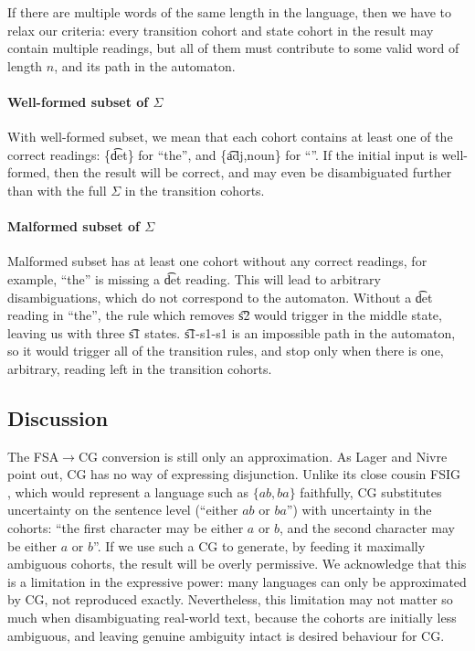 If there are multiple words of the same length in the language, then
we have to relax our criteria: every transition cohort and state
cohort in the result may contain multiple readings, but all of them
must contribute to some valid word of length $n$, and its path in the
automaton. 

\paragraph{Well-formed subset of $\Sigma$}
With well-formed subset, we mean that each cohort contains
at least one of the correct readings: \{\t{det}\} for ``the'', and
\{\t{adj,noun}\} for ``\exampleWord{}''. 
If the initial input is well-formed, then the result will be correct,
and may even be disambiguated further than with the full $\Sigma$ in
the transition cohorts.

\paragraph{Malformed subset of $\Sigma$}
Malformed subset has at least one cohort without any correct readings,
for example, ``the'' is missing a \t{det} reading.
This will lead to arbitrary disambiguations, which do not correspond to the automaton.
Without a \t{det} reading in ``the'', the rule which removes \t{s2}
would trigger in the middle state, leaving us with three \t{s1}
states. \t{s1-s1-s1} is an impossible path in the automaton,
so it would trigger all of the transition rules, and stop only when
there is one, arbitrary, reading left in the transition cohorts.




\subsection{Discussion}

The FSA$\rightarrow$CG conversion is still only an approximation.
As Lager and Nivre \cite{lager_nivre01} point out, CG has no way of expressing disjunction.
Unlike its close cousin FSIG \cite{koskenniemi90}, which would represent a 
language such as $\{ab,ba\}$ faithfully, CG substitutes uncertainty on the 
sentence level (``either $ab$ or $ba$'') with uncertainty in the cohorts: 
``the first character may be either $a$ or $b$, and the second character 
may be either $a$ or $b$''.
If we use such a CG to generate, by feeding it
maximally ambiguous cohorts, the result will be overly permissive.
We acknowledge that this is a limitation in the expressive power: many
languages can only be approximated by CG, not reproduced exactly.
Nevertheless, this limitation may not matter so much when
disambiguating real-world text, because the cohorts are initially less
ambiguous, and leaving genuine ambiguity intact is desired behaviour
for CG. 

